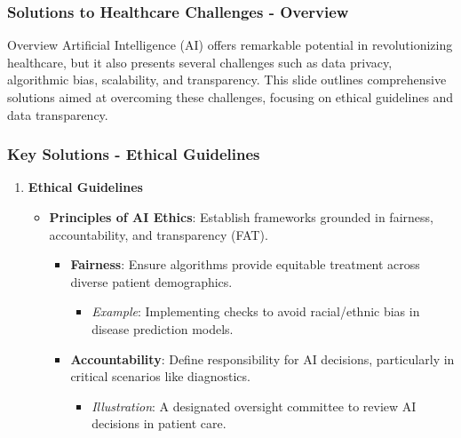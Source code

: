 \documentclass[aspectratio=169]{beamer}
\begin{document}
\begin{frame}[fragile]
    \frametitle{Solutions to Healthcare Challenges - Overview}
    \begin{block}{Overview}
        Artificial Intelligence (AI) offers remarkable potential in revolutionizing healthcare, but it 
        also presents several challenges such as data privacy, algorithmic bias, scalability, and 
        transparency. This slide outlines comprehensive solutions aimed at overcoming these challenges, 
        focusing on ethical guidelines and data transparency.
    \end{block}
\end{frame}

\begin{frame}[fragile]
    \frametitle{Key Solutions - Ethical Guidelines}
    \begin{enumerate}
        \item \textbf{Ethical Guidelines}
            \begin{itemize}
                \item \textbf{Principles of AI Ethics}: Establish frameworks grounded in fairness, accountability, and transparency (FAT).
                \begin{itemize}
                    \item \textbf{Fairness}: Ensure algorithms provide equitable treatment across diverse patient demographics.
                    \begin{itemize}
                        \item \textit{Example}: Implementing checks to avoid racial/ethnic bias in disease prediction models.
                    \end{itemize}
                    \item \textbf{Accountability}: Define responsibility for AI decisions, particularly in critical scenarios like diagnostics.
                    \begin{itemize}
                        \item \textit{Illustration}: A designated oversight committee to review AI decisions in patient care.
                    \end{itemize}
                \end{itemize}
            \end{itemize}
    \end{enumerate}
\end{frame}
\end{document}

